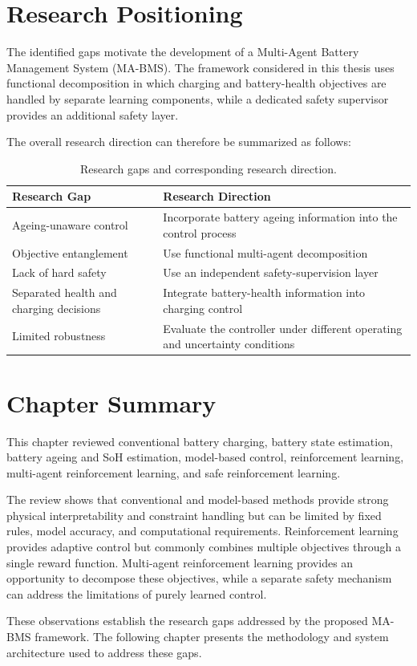 \section{Research Positioning}

The identified gaps motivate the development of a Multi-Agent Battery
Management System (MA-BMS). The framework considered in this thesis
uses functional decomposition in which charging and battery-health
objectives are handled by separate learning components, while a
dedicated safety supervisor provides an additional safety layer.

The overall research direction can therefore be summarized as follows:

\begin{table}[htbp]
\centering
\caption{Research gaps and corresponding research direction.}
\label{tab:research_positioning}
\begin{tabular}{p{4.2cm}p{7.0cm}}
\toprule
\textbf{Research Gap} & \textbf{Research Direction} \\
\midrule
Ageing-unaware control &
Incorporate battery ageing information into the control process \\

Objective entanglement &
Use functional multi-agent decomposition \\

Lack of hard safety &
Use an independent safety-supervision layer \\

Separated health and charging decisions &
Integrate battery-health information into charging control \\

Limited robustness &
Evaluate the controller under different operating and uncertainty
conditions \\
\bottomrule
\end{tabular}
\end{table}

\section{Chapter Summary}

This chapter reviewed conventional battery charging, battery state
estimation, battery ageing and SoH estimation, model-based control,
reinforcement learning, multi-agent reinforcement learning, and safe
reinforcement learning.

The review shows that conventional and model-based methods provide
strong physical interpretability and constraint handling but can be
limited by fixed rules, model accuracy, and computational requirements.
Reinforcement learning provides adaptive control but commonly combines
multiple objectives through a single reward function. Multi-agent
reinforcement learning provides an opportunity to decompose these
objectives, while a separate safety mechanism can address the
limitations of purely learned control.

These observations establish the research gaps addressed by the
proposed MA-BMS framework. The following chapter presents the
methodology and system architecture used to address these gaps.